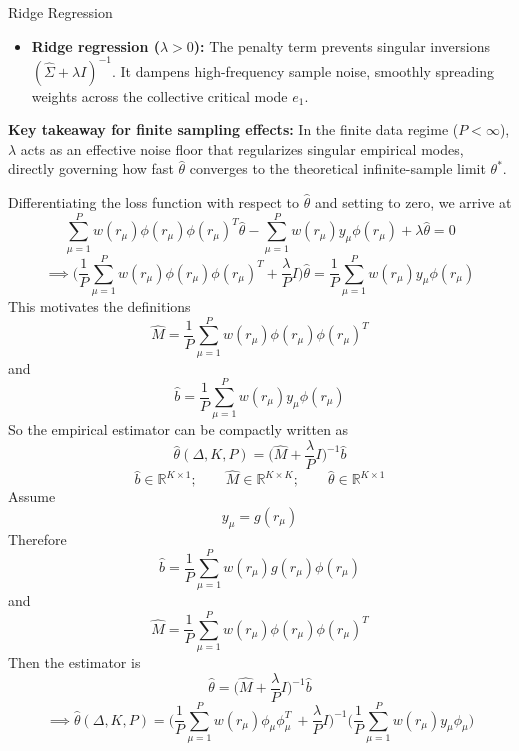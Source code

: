 \documentclass[11pt,a4paper]{article}
\theoremstyle{remark}
\begin{document}
\begin{onehalfspace}
\begin{entetebox}{\large{Ridge Regression}}
\begin{itemize}
    \item \textbf{Ridge regression ($\lambda > 0$):} 
    The penalty term prevents singular inversions $(\widehat{\Sigma} + \lambda I)^{-1}$. It dampens high-frequency sample noise, smoothly spreading weights across the collective critical mode $e_1$.
\end{itemize}

\tcbline

\textbf{Key takeaway for finite sampling effects:}
In the finite data regime ($P < \infty$), $\lambda$ acts as an effective noise floor that regularizes singular empirical modes, directly governing how fast $\hat{\theta}$ converges to the theoretical infinite-sample limit $\theta^*$.
\end{entetebox}

Differentiating the loss function with respect to $\hat\theta$ and setting to zero, we arrive at
$$ \sum_{\mu=1}^{P} w(r_\mu)\phi(r_\mu)\phi(r_\mu)^T \hat\theta - \sum_{\mu=1}^{P} w(r_\mu)y_\mu\phi(r_\mu) + \lambda \hat\theta = 0$$
$$\implies \bigg( \frac{1}{P} \sum_{\mu=1}^{P}w(r_\mu)\phi(r_\mu)\phi(r_\mu)^T + \frac{\lambda}{P}I\bigg )\hat\theta = \frac{1}{P}\sum_{\mu=1}^{P}w(r_\mu)y_\mu\phi(r_\mu)$$
This motivates the definitions
\begin{equation}
     \hat{M} = \frac{1}{P}\sum_{\mu=1}^{P}w(r_\mu)\phi(r_\mu)\phi(r_\mu)^T
\end{equation}
and 
\begin{equation}
    \hat{b} = \frac{1}{P}\sum_{\mu=1}^{P}w(r_\mu)y_\mu\phi(r_\mu)
\end{equation}
So the empirical estimator can be compactly written as 
\begin{equation}\label{eq:finite_sample_theta}
    \hat{\theta}(\Delta, K, P) = \big ( \hat{M} + \frac{\lambda}{P}I\big )^{-1}\hat{b} 
\end{equation}
\begin{equation}
\hat b \in \mathbb{R}^{K\times 1};\qquad \hat M \in \mathbb{R}^{K\times K};\qquad \hat\theta \in \mathbb{R}^{K\times 1}
\end{equation}
Assume
\begin{equation} y_{\mu} = g(r_{\mu}) \end{equation}
Therefore
\begin{equation}
\hat{b} = \frac{1}{P}\sum_{\mu=1}^{P} w(r_\mu)g(r_\mu)\phi(r_\mu) 
\end{equation}
and
\begin{equation} \hat{M} = \frac{1}{P}\sum_{\mu=1}^{P}w(r_\mu)\phi(r_\mu)\phi(r_\mu)^T \end{equation}
Then the estimator is 
\begin{equation}
    \hat{\theta} = \big( \hat{M} + \frac{\lambda}{P}I\big)^{-1}\hat{b}
\end{equation}
\begin{equation} 
    \implies \hat \theta(\Delta, K, P) = \bigg (\frac{1}{P}\sum_{\mu=1}^P w(r_{\mu})\phi_{\mu}\phi_{\mu}^T\ + \frac{\lambda}{P}I\bigg)^{-1}\bigg (\frac{1}{P}\sum_{\mu=1}^P w(r_{\mu})y_{\mu}\phi_{\mu} \bigg)
\end{equation}


\end{onehalfspace}
\end{document}
